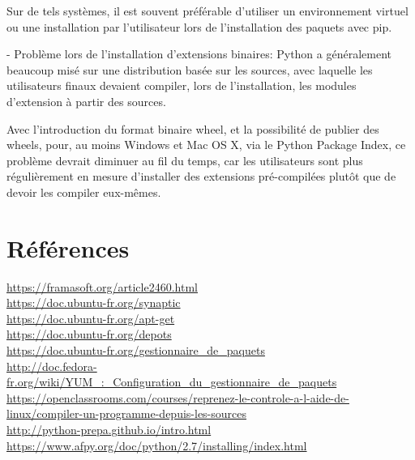 \documentclass[a4paper,12pt]{article}
\begin{document}
Sur de tels systèmes, il est souvent préférable d’utiliser un environnement virtuel ou une installation par l’utilisateur lors de l’installation des paquets avec pip.

- Problème lors de l'installation d'extensions binaires:
Python a généralement beaucoup misé sur une distribution basée sur les sources, avec laquelle les utilisateurs finaux devaient compiler, lors de l’installation, les modules d’extension à partir des sources.

Avec l’introduction du format binaire wheel, et la possibilité de publier des wheels, pour, au moins Windows et Mac OS X, via le Python Package Index, ce problème devrait diminuer au fil du temps, car les utilisateurs sont plus régulièrement en mesure d’installer des extensions pré-compilées plutôt que de devoir les compiler eux-mêmes.

\clearpage
\section{Références}


\url{https://framasoft.org/article2460.html}\\
\url{https://doc.ubuntu-fr.org/synaptic}\\
\url{https://doc.ubuntu-fr.org/apt-get}\\
\url{https://doc.ubuntu-fr.org/depots}\\
\url{https://doc.ubuntu-fr.org/gestionnaire_de_paquets}\\
\url{http://doc.fedora-fr.org/wiki/YUM_:_Configuration_du_gestionnaire_de_paquets}\\
\url{https://openclassrooms.com/courses/reprenez-le-controle-a-l-aide-de-linux/compiler-un-programme-depuis-les-sources}\\
\url{http://python-prepa.github.io/intro.html}\\
\url{https://www.afpy.org/doc/python/2.7/installing/index.html}\\
\end{document}
